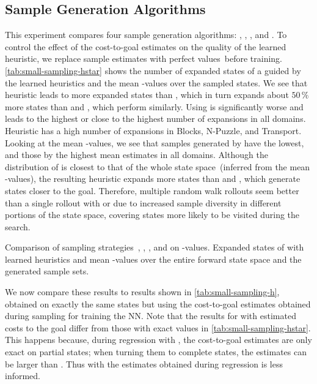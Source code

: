 \subsection{Sample Generation Algorithms}
\label{sec:small-exps-algorithm}

This experiment compares four sample generation algorithms: \bfs, \dfs, \rw, and \bfsrw. To control the effect of the cost-to-goal estimates on the quality of the learned heuristic, we replace sample estimates with perfect values~\hstar before training. \cref{tab:small-sampling-hstar} shows the number of expanded states of a \gbfs guided by the learned heuristics and the mean \hstar-values over the sampled states. We see that heuristic \hnnl{\bfs} leads to more expanded states than \hnnl{\dfs}, which in turn expands about $50\,\%$ more states than \hnnl{\rw} and \hnnl{\bfsrw}, which perform similarly. Using \hnnl{\bfs} is significantly worse and leads to the highest or close to the highest number of expansions in all domains. Heuristic \hnnl{\dfs} has a high number of expansions in Blocks, N-Puzzle, and Transport. Looking at the mean \hstar-values, we see that samples generated by \bfs have the lowest, and those by \dfs the highest mean estimates in all domains. Although the distribution of \dfs is closest to that of the whole state space~(inferred from the mean \hstar-values), the resulting heuristic expands more states than \rw and \bfsrw, which generate states closer to the goal. Therefore, multiple random walk rollouts seem better than a single rollout with \bfs or \dfs due to increased sample diversity in different portions of the state space, covering states more likely to be visited during the search.

\begin{table}[tb]
    \caption[Comparison of sampling strategies on \hstar-values.]{Comparison of sampling strategies~\bfs, \dfs, \rw, and \bfsrw on \hstar-values. Expanded states of \gbfs with learned heuristics and mean \hstar-values over the entire forward state space and the generated sample sets.}
    \label{tab:small-sampling-hstar}
    \addmargin
    \centering
    
\end{table}

We now compare these results to results shown in \cref{tab:small-sampling-h}, obtained on exactly the same states but using the cost-to-goal estimates obtained during sampling for training the NN. Note that the results for \bfs with estimated costs to the goal differ from those with exact values in \cref{tab:small-sampling-hstar}. This happens because, during regression with \bfs, the cost-to-goal estimates are only exact on partial states; when turning them to complete states, the estimates can be larger than \hstar. Thus \hnnl{\bfs} with the estimates obtained during regression is less informed.

